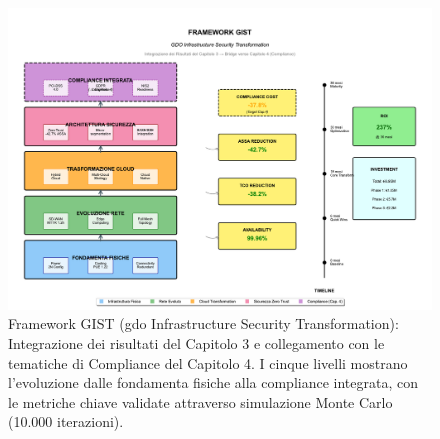 \begin{figure}[htbp]
\centering
\includegraphics[width=\textwidth]{thesis_figures/cap3/figura_3_6_framework_integrato.pdf}
\caption{Framework GIST (\gls{gdo} Infrastructure Security Transformation): Integrazione dei risultati del Capitolo 3 e collegamento con le tematiche di Compliance del Capitolo 4. I cinque livelli mostrano l'evoluzione dalle fondamenta fisiche alla compliance integrata, con le metriche chiave validate attraverso simulazione Monte Carlo (10.000 iterazioni).}
\label{fig:framework_gist}
\end{figure}

\clearpage
\printbibliography[
    heading=subbibliography,
    title={Riferimenti Bibliografici del Capitolo 3},
]

\endrefsection

\clearpage
